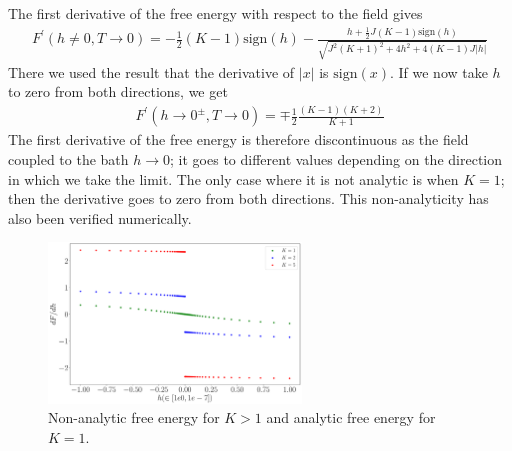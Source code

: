 \documentclass[12pt]{revtex4-2}
\begin{document}
The first derivative of the free energy with respect to the field gives
\begin{equation}\begin{aligned}
	F^\prime(h\neq 0, T\to 0) = - \frac{1}{2}(K-1)\text{sign}(h) - \frac{h + \frac{1}{2}J(K-1)\text{sign}(h)}{\sqrt{J^2(K+1)^2 + 4h^2 + 4\left(K-1\right) J |h|}}
\end{aligned}\end{equation}
There we used the result that the derivative of \(|x|\) is \(\text{sign}(x)\). If we now take \(h\) to zero from both directions, we get
\begin{equation}\begin{aligned}
	F^\prime(h \to 0^\pm, T\to 0) = \mp \frac{1}{2}\frac{(K-1)(K+2)}{K+1}
\end{aligned}\end{equation}
The first derivative of the free energy is therefore discontinuous as the field coupled to the bath \(h\to 0\); it goes to different values depending on the direction in which we take the limit. The only case where it is not analytic is when \(K=1\); then the derivative goes to zero from both directions. This non-analyticity has also been verified numerically.
\begin{figure}[htpb]
	\centering
	\includegraphics[width=0.6\textwidth]{../numerics/disc_mag_bath.pdf}
	\caption{Non-analytic free energy for \(K>1\) and analytic free energy for \(K=1\).}
\end{figure}
\end{document}
